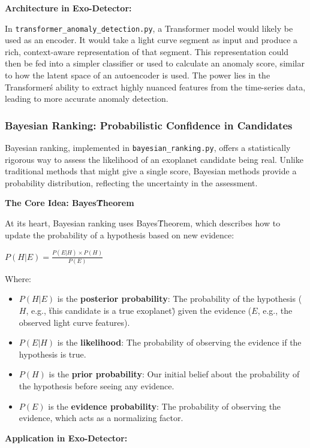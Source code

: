 \documentclass{article}
\begin{document}
\textbf{Architecture in Exo-Detector:}

In \texttt{transformer\_anomaly\_detection.py}, a Transformer model would likely be used as an encoder. It would take a light curve segment as input and produce a rich, context-aware representation of that segment. This representation could then be fed into a simpler classifier or used to calculate an anomaly score, similar to how the latent space of an autoencoder is used. The power lies in the Transformer\'s ability to extract highly nuanced features from the time-series data, leading to more accurate anomaly detection.

\subsubsection{Bayesian Ranking: Probabilistic Confidence in Candidates}

Bayesian ranking, implemented in \texttt{bayesian\_ranking.py}, offers a statistically rigorous way to assess the likelihood of an exoplanet candidate being real. Unlike traditional methods that might give a single score, Bayesian methods provide a probability distribution, reflecting the uncertainty in the assessment.

\textbf{The Core Idea: Bayes\' Theorem}

At its heart, Bayesian ranking uses Bayes\' Theorem, which describes how to update the probability of a hypothesis based on new evidence:

$P(H|E) = \frac{P(E|H) \times P(H)}{P(E)}$

Where:
\begin{itemize}
    \item $P(H|E)$ is the \textbf{posterior probability}: The probability of the hypothesis ($H$, e.g., \"this candidate is a true exoplanet\") given the evidence ($E$, e.g., the observed light curve features).
    \item $P(E|H)$ is the \textbf{likelihood}: The probability of observing the evidence if the hypothesis is true.
    \item $P(H)$ is the \textbf{prior probability}: Our initial belief about the probability of the hypothesis before seeing any evidence.
    \item $P(E)$ is the \textbf{evidence probability}: The probability of observing the evidence, which acts as a normalizing factor.
\end{itemize}

\textbf{Application in Exo-Detector:}
\end{document}
